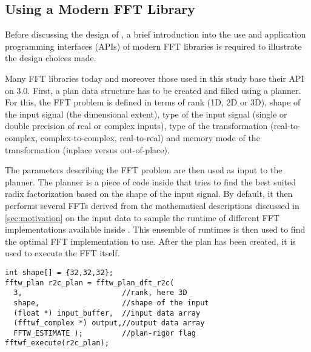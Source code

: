 
\subsection{Using a Modern FFT Library}
\label{ssec:modern_ffts}
Before discussing the design of \gearshifft{}, a brief introduction into the use and application programming interfaces (APIs) of modern FFT libraries is required to illustrate the design choices made.

Many FFT libraries today and moreover those used in this study base their API on \fftw{} $3.0$. First, a plan data structure has to be created and filled using a planner. For this, the FFT problem is defined in terms of rank (1D, 2D or 3D), shape of the input signal (the dimensional extent), type of the input signal (single or double precision of real or complex inputs), type of the transformation (real-to-complex, complex-to-complex, real-to-real) and memory mode of the transformation (inplace versus out-of-place). 

The parameters describing the FFT problem are then used as input to the planner. The planner is a piece of code inside \fftw{} that tries to find the best suited radix factorization based on the shape of the input signal. By default, it then performs several FFTs derived from the mathematical descriptions discussed in \cref{sec:motivation} on the input data to sample the runtime of different FFT implementations available inside \fftw{}. This ensemble of runtimes is then used to find the optimal FFT implementation to use. After the plan has been created, it is used to execute the FFT itself.

\begin{lstlisting}[caption={Minimal usage example of the \fftw{} single precision real-to-complex planner API. Memory management is omitted.},label={lst:fftw_example}]
int shape[] = {32,32,32};
fftw_plan r2c_plan = fftw_plan_dft_r2c(
  3,                       //rank, here 3D
  shape,                   //shape of the input
  (float *) input_buffer,  //input data array
  (fftwf_complex *) output,//output data array
  FFTW_ESTIMATE );         //plan-rigor flag
fftwf_execute(r2c_plan);
\end{lstlisting}

